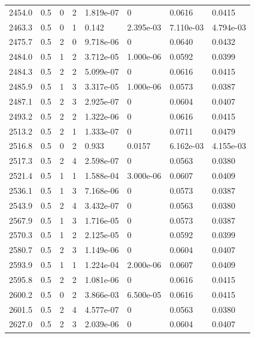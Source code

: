 \documentclass[preview]{standalone}
\begin{document}
{{{{{{{\begin{tabular}{L{1.2cm}C{1.2cm} C{0.3cm}C{0.5cm} C{1.4cm}C{1.4cm} C{1.4cm}C{1.4cm}}
  2454.0  &   0.5  & 0     &  2 &  1.819e-07  & 0  & 0.0616 &  0.0415   \\ 
  2463.3  &   0.5  & 0     &  1 &  0.142  & 2.395e-03  & 7.110e-03 &  4.794e-03   \\ 
  2475.7  &   0.5  & 2     &  0 &  9.718e-06  & 0  & 0.0640 &  0.0432   \\ 
  2484.0  &   0.5  & 1     &  2 &  3.712e-05  & 1.000e-06  & 0.0592 &  0.0399   \\ 
  2484.3  &   0.5  & 2     &  2 &  5.099e-07  & 0  & 0.0616 &  0.0415   \\ 
  2485.9  &   0.5  & 1     &  3 &  3.317e-05  & 1.000e-06  & 0.0573 &  0.0387   \\ 
  2487.1  &   0.5  & 2     &  3 &  2.925e-07  & 0  & 0.0604 &  0.0407   \\ 
  2493.2  &   0.5  & 2     &  2 &  1.322e-06  & 0  & 0.0616 &  0.0415   \\ 
  2513.2  &   0.5  & 2     &  1 &  1.333e-07  & 0  & 0.0711 &  0.0479   \\ 
  2516.8  &   0.5  & 0     &  2 &  0.933  & 0.0157  & 6.162e-03 &  4.155e-03   \\ 
  2517.3  &   0.5  & 2     &  4 &  2.598e-07  & 0  & 0.0563 &  0.0380   \\ 
  2521.4  &   0.5  & 1     &  1 &  1.588e-04  & 3.000e-06  & 0.0607 &  0.0409   \\ 
  2536.1  &   0.5  & 1     &  3 &  7.168e-06  & 0  & 0.0573 &  0.0387   \\ 
  2543.9  &   0.5  & 2     &  4 &  3.432e-07  & 0  & 0.0563 &  0.0380   \\ 
  2567.9  &   0.5  & 1     &  3 &  1.716e-05  & 0  & 0.0573 &  0.0387   \\ 
  2570.3  &   0.5  & 1     &  2 &  2.125e-05  & 0  & 0.0592 &  0.0399   \\ 
  2580.7  &   0.5  & 2     &  3 &  1.149e-06  & 0  & 0.0604 &  0.0407   \\ 
  2593.9  &   0.5  & 1     &  1 &  1.224e-04  & 2.000e-06  & 0.0607 &  0.0409   \\ 
  2595.8  &   0.5  & 2     &  2 &  1.081e-06  & 0  & 0.0616 &  0.0415   \\ 
  2600.2  &   0.5  & 0     &  2 &  3.866e-03  & 6.500e-05  & 0.0616 &  0.0415   \\ 
  2601.5  &   0.5  & 2     &  4 &  4.577e-07  & 0  & 0.0563 &  0.0380   \\ 
  2627.0  &   0.5  & 2     &  3 &  2.039e-06  & 0  & 0.0604 &  0.0407   \\ 

\end{tabular}}}}}}}}
\end{document}
